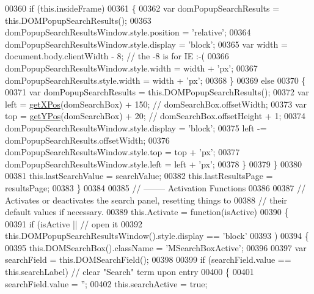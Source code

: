 \begin{DoxyCode}
00360        \textcolor{keywordflow}{if} (this.insideFrame)
00361        \{
00362          var domPopupSearchResults = this.DOMPopupSearchResults();
00363          domPopupSearchResultsWindow.style.position = \textcolor{stringliteral}{'relative'};
00364          domPopupSearchResultsWindow.style.display  = \textcolor{stringliteral}{'block'};
00365          var width = document.body.clientWidth - 8; \textcolor{comment}{// the -8 is for IE :-(}
00366          domPopupSearchResultsWindow.style.width    = width + \textcolor{stringliteral}{'px'};
00367          domPopupSearchResults.style.width          = width + \textcolor{stringliteral}{'px'};
00368        \}
00369        \textcolor{keywordflow}{else}
00370        \{
00371          var domPopupSearchResults = this.DOMPopupSearchResults();
00372          var left = \hyperlink{search_8js_a76d24aea0009f892f8ccc31d941c0a2b}{getXPos}(domSearchBox) + 150; \textcolor{comment}{// domSearchBox.offsetWidth;}
00373          var top  = \hyperlink{search_8js_a8d7b405228661d7b6216b6925d2b8a69}{getYPos}(domSearchBox) + 20;  \textcolor{comment}{// domSearchBox.offsetHeight + 1;}
00374          domPopupSearchResultsWindow.style.display = \textcolor{stringliteral}{'block'};
00375          left -= domPopupSearchResults.offsetWidth;
00376          domPopupSearchResultsWindow.style.top     = top  + \textcolor{stringliteral}{'px'};
00377          domPopupSearchResultsWindow.style.left    = left + \textcolor{stringliteral}{'px'};
00378        \}
00379     \}
00380 
00381     this.lastSearchValue = searchValue;
00382     this.lastResultsPage = resultsPage;
00383   \}
00384 
00385   \textcolor{comment}{// -------- Activation Functions}
00386 
00387   \textcolor{comment}{// Activates or deactivates the search panel, resetting things to }
00388   \textcolor{comment}{// their default values if necessary. }
00389   this.Activate = \textcolor{keyword}{function}(isActive)
00390   \{
00391     \textcolor{keywordflow}{if} (isActive || \textcolor{comment}{// open it}
00392         this.DOMPopupSearchResultsWindow().style.display == \textcolor{stringliteral}{'block'} 
00393        )
00394     \{
00395       this.DOMSearchBox().className = \textcolor{stringliteral}{'MSearchBoxActive'};
00396 
00397       var searchField = this.DOMSearchField();
00398 
00399       \textcolor{keywordflow}{if} (searchField.value == \textcolor{keyword}{this}.searchLabel) \textcolor{comment}{// clear "Search" term upon entry}
00400       \{  
00401         searchField.value = \textcolor{stringliteral}{''};  
00402         this.searchActive = \textcolor{keyword}{true};

\end{DoxyCode}
